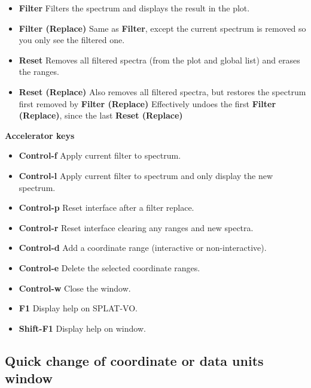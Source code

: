 \documentclass[twoside,11pt]{article}
\renewcommand{\_}{\texttt{\symbol{95}}}
\newcommand{\SPLAT}{\textsf{SPLAT-VO}}
\newcommand{\labelitem}[1]{\textbf{#1}}
\newcommand{\subheading}[1]{\textbf{\large{#1}}}
\begin{document}
\begin{itemize}

\item \labelitem{Filter} Filters the spectrum and displays the result in the 
plot.

\item \labelitem{Filter (Replace)} Same as \labelitem{Filter}, except the
current spectrum is removed so you only see the filtered one.

\item \labelitem{Reset} Removes all filtered spectra (from the plot and global
list) and erases the ranges. 

\item \labelitem{Reset (Replace)} Also removes all filtered spectra, but
restores the spectrum first removed by \labelitem{Filter (Replace)}
Effectively undoes the first \labelitem{Filter (Replace)}, since the last
\labelitem{Reset (Replace)}

\end{itemize}

\subheading{Accelerator keys}

\begin{itemize}
\item \labelitem{Control-f} Apply current filter to spectrum.
\item \labelitem{Control-l} Apply current filter to spectrum and only display the new spectrum.
\item \labelitem{Control-p} Reset interface after a filter replace.
\item \labelitem{Control-r} Reset interface clearing any ranges and new spectra.

\item \labelitem{Control-d} Add a coordinate range (interactive or non-interactive).
\item \labelitem{Control-e} Delete the selected coordinate ranges.
 
\item \labelitem{Control-w} Close the window.
\item \labelitem{F1} Display help on \SPLAT.     
\item \labelitem{Shift-F1} Display help on window.
\end{itemize}


\newpage
\subsection{Quick change of coordinate or data units window}
\end{document}
